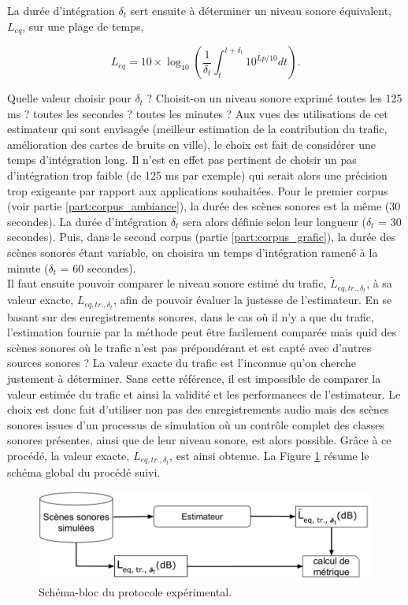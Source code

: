 La durée d'intégration $\delta_t$ sert ensuite à déterminer un niveau sonore équivalent, $L_{eq}$, sur une plage de temps,

\begin{equation}
L_{eq} = 10 \times \log_{10}\left(\frac{1}{\delta_t} \int_t^{t+\delta_t} 10^{Lp/10} dt \right).
\end{equation}

Quelle valeur choisir pour $\delta_t$ ? Choisit-on un niveau sonore exprimé toutes les 125 ms ? toutes les secondes ? toutes les minutes ? Aux vues des utilisations de cet estimateur qui sont envisagée (meilleur estimation de la contribution du trafic, amélioration des cartes de bruits en ville), le choix est fait de considérer une temps d'intégration long. Il n'est en effet pas pertinent de choisir un pas d'intégration trop faible (de 125 ms par exemple) qui serait alors une précision trop exigeante par rapport aux applications souhaitées. 
Pour le premier corpus (voir partie \ref{part:corpus_ambiance}), la durée des scènes sonores est la même (30 secondes). La durée d'intégration $\delta_t$  sera alors définie selon leur longueur ($\delta_t$ = 30 secondes). Puis, dans le second corpus (partie \ref{part:corpus_grafic}), la durée des scènes sonores étant variable, on choisira un temps d'intégration ramené à la minute ($\delta_t$ = 60 secondes).\\

Il faut ensuite pouvoir comparer le niveau sonore estimé du trafic, $\tilde{L}_{eq,tr., \delta_t}$, à sa valeur exacte, $L_{eq,tr., \delta_t}$, afin de pouvoir évaluer la justesse de l'estimateur. En se basant sur des enregistrements sonores, dans le cas où il n'y a que du trafic, l'estimation fournie par la méthode peut être facilement comparée mais quid des scènes sonores où le trafic n'est pas prépondérant et est capté avec d'autres sources sonores ? La valeur exacte du trafic est l'inconnue qu'on cherche justement à déterminer. Sans cette référence, il est impossible de comparer la valeur estimée du trafic et ainsi la validité et les performances de l'estimateur.
Le choix est donc fait d'utiliser non pas des enregistrements audio mais des scènes sonores issues d'un processus de simulation où un contrôle complet des classes sonores présentes, ainsi que de leur niveau sonore, est alors possible. Grâce à ce procédé, la valeur exacte, $L_{eq,tr.,\delta_t}$, est ainsi obtenue. La Figure \ref{fig:diagramBlocProtocol} résume le schéma global du procédé suivi.

\begin{figure}[ht]
\centering
\includegraphics[width=0.8\linewidth]{./figures/autres/bloc_diagramme_principe.pdf}
\caption{Schéma-bloc du protocole expérimental.}
\label{fig:diagramBlocProtocol}
\end{figure}

